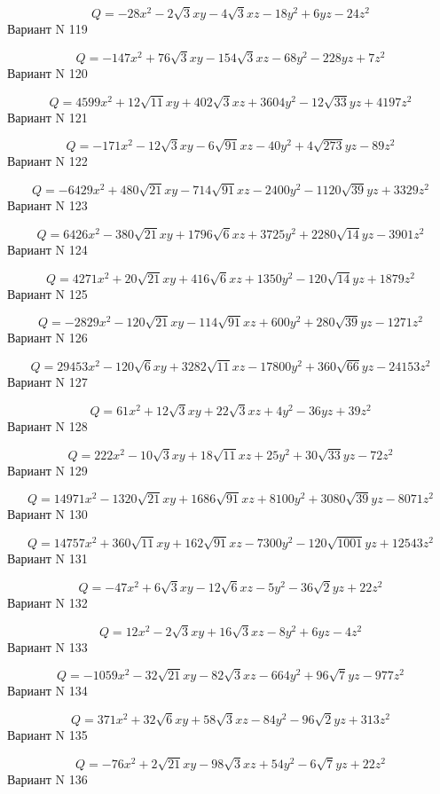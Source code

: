 \documentclass[11pt]{report}
\begin{document}
$$Q = - 28 x^{2} - 2 \sqrt{3} x y - 4 \sqrt{3} x z - 18 y^{2} + 6 y z - 24 z^{2}$$Вариант N 119

$$Q = - 147 x^{2} + 76 \sqrt{3} x y - 154 \sqrt{3} x z - 68 y^{2} - 228 y z + 7 z^{2}$$Вариант N 120

$$Q = 4599 x^{2} + 12 \sqrt{11} x y + 402 \sqrt{3} x z + 3604 y^{2} - 12 \sqrt{33} y z + 4197 z^{2}$$Вариант N 121

$$Q = - 171 x^{2} - 12 \sqrt{3} x y - 6 \sqrt{91} x z - 40 y^{2} + 4 \sqrt{273} y z - 89 z^{2}$$Вариант N 122

$$Q = - 6429 x^{2} + 480 \sqrt{21} x y - 714 \sqrt{91} x z - 2400 y^{2} - 1120 \sqrt{39} y z + 3329 z^{2}$$Вариант N 123

$$Q = 6426 x^{2} - 380 \sqrt{21} x y + 1796 \sqrt{6} x z + 3725 y^{2} + 2280 \sqrt{14} y z - 3901 z^{2}$$Вариант N 124

$$Q = 4271 x^{2} + 20 \sqrt{21} x y + 416 \sqrt{6} x z + 1350 y^{2} - 120 \sqrt{14} y z + 1879 z^{2}$$Вариант N 125

$$Q = - 2829 x^{2} - 120 \sqrt{21} x y - 114 \sqrt{91} x z + 600 y^{2} + 280 \sqrt{39} y z - 1271 z^{2}$$Вариант N 126

$$Q = 29453 x^{2} - 120 \sqrt{6} x y + 3282 \sqrt{11} x z - 17800 y^{2} + 360 \sqrt{66} y z - 24153 z^{2}$$Вариант N 127

$$Q = 61 x^{2} + 12 \sqrt{3} x y + 22 \sqrt{3} x z + 4 y^{2} - 36 y z + 39 z^{2}$$Вариант N 128

$$Q = 222 x^{2} - 10 \sqrt{3} x y + 18 \sqrt{11} x z + 25 y^{2} + 30 \sqrt{33} y z - 72 z^{2}$$Вариант N 129

$$Q = 14971 x^{2} - 1320 \sqrt{21} x y + 1686 \sqrt{91} x z + 8100 y^{2} + 3080 \sqrt{39} y z - 8071 z^{2}$$Вариант N 130

$$Q = 14757 x^{2} + 360 \sqrt{11} x y + 162 \sqrt{91} x z - 7300 y^{2} - 120 \sqrt{1001} y z + 12543 z^{2}$$Вариант N 131

$$Q = - 47 x^{2} + 6 \sqrt{3} x y - 12 \sqrt{6} x z - 5 y^{2} - 36 \sqrt{2} y z + 22 z^{2}$$Вариант N 132

$$Q = 12 x^{2} - 2 \sqrt{3} x y + 16 \sqrt{3} x z - 8 y^{2} + 6 y z - 4 z^{2}$$Вариант N 133

$$Q = - 1059 x^{2} - 32 \sqrt{21} x y - 82 \sqrt{3} x z - 664 y^{2} + 96 \sqrt{7} y z - 977 z^{2}$$Вариант N 134

$$Q = 371 x^{2} + 32 \sqrt{6} x y + 58 \sqrt{3} x z - 84 y^{2} - 96 \sqrt{2} y z + 313 z^{2}$$Вариант N 135

$$Q = - 76 x^{2} + 2 \sqrt{21} x y - 98 \sqrt{3} x z + 54 y^{2} - 6 \sqrt{7} y z + 22 z^{2}$$Вариант N 136
\end{document}
